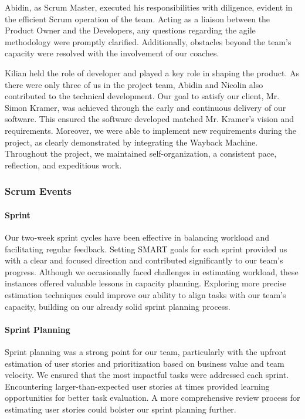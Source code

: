 Abidin, as Scrum Master, executed his responsibilities with diligence, evident in the efficient Scrum operation of the team.
Acting as a liaison between the Product Owner and the Developers, any questions regarding the agile methodology were promptly clarified.
Additionally, obstacles beyond the team's capacity were resolved with the involvement of our coaches.

Kilian held the role of developer and played a key role in shaping the product.
As there were only three of us in the project team, Abidin and Nicolin also contributed to the technical development.
Our goal to satisfy our client, Mr. Simon Kramer, was achieved through the early and continuous delivery of our software.
This ensured the software developed matched Mr. Kramer's vision and requirements.
Moreover, we were able to implement new requirements during the project, as clearly demonstrated by integrating the Wayback Machine.
Throughout the project, we maintained self-organization, a consistent pace, reflection, and expeditious work.

\subsubsection{Scrum Events}

\paragraph{Sprint}
Our two-week sprint cycles have been effective in balancing workload and facilitating regular feedback.
Setting SMART goals for each sprint provided us with a clear and focused direction and contributed significantly to our team's progress.
Although we occasionally faced challenges in estimating workload, these instances offered valuable lessons in capacity planning.
Exploring more precise estimation techniques could improve our ability to align tasks with our team's capacity, building on our already solid sprint planning process.

\paragraph{Sprint Planning}
Sprint planning was a strong point for our team, particularly with the upfront estimation of user stories and prioritization based on business value and team velocity.
We ensured that the most impactful tasks were addressed each sprint.
Encountering larger-than-expected user stories at times provided learning opportunities for better task evaluation.
A more comprehensive review process for estimating user stories could bolster our sprint planning further.

